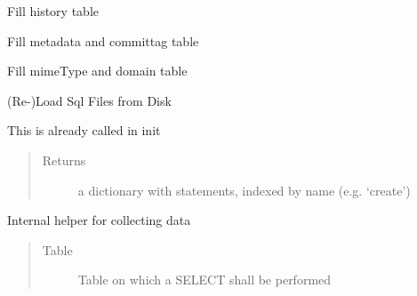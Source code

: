 \documentclass[letterpaper,10pt,english]{sphinxmanual}
\begin{document}
\begin{fulllineitems}
\begin{fulllineitems}
\label{dbgen:crawler.dbgen.DBGenerator.insert_history}
Fill history table

\end{fulllineitems}


\begin{fulllineitems}
\label{dbgen:crawler.dbgen.DBGenerator.insert_mdata_ctag}
Fill metadata and committag table

\end{fulllineitems}


\begin{fulllineitems}
\label{dbgen:crawler.dbgen.DBGenerator.insert_mime_domain}
Fill mimeType and domain table

\end{fulllineitems}


\begin{fulllineitems}
\label{dbgen:crawler.dbgen.DBGenerator.load_statements}
(Re-)Load Sql Files from Disk

This is already called in init
\begin{quote}\begin{description}
\item[{Returns}] \leavevmode
a dictionary with statements, indexed by name (e.g. `create')

\end{description}\end{quote}

\end{fulllineitems}


\begin{fulllineitems}
\label{dbgen:crawler.dbgen.DBGenerator.select}
Internal helper for collecting data
\begin{quote}\begin{description}
\item[{Table }] \leavevmode
Table on which a SELECT shall be performed


\end{description}
\end{quote}
\end{fulllineitems}
\end{fulllineitems}
\end{document}
